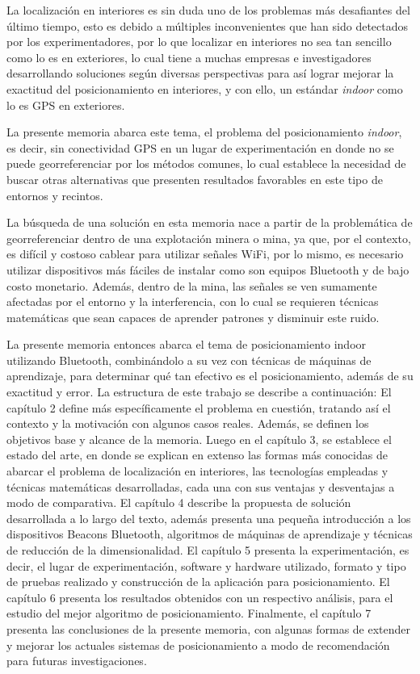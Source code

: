 La localización en interiores es sin duda uno de los problemas más desafiantes del último tiempo, esto es debido a múltiples inconvenientes que han sido detectados por los experimentadores, por lo que localizar en interiores no sea tan sencillo como lo es en exteriores, lo cual tiene a muchas empresas e investigadores desarrollando soluciones según diversas perspectivas para así lograr mejorar la exactitud del posicionamiento en interiores, y con ello,  un estándar \textit{indoor} como lo es GPS en exteriores.

La presente memoria abarca este tema, el problema del posicionamiento \textit{indoor}, es decir, sin conectividad GPS en un lugar de experimentación en donde no se puede georreferenciar por los métodos comunes, lo cual establece la necesidad de buscar otras alternativas que presenten resultados favorables en este tipo de entornos y recintos.

La búsqueda de una solución en esta memoria nace a partir de la problemática de georreferenciar dentro de una explotación minera o mina, ya que, por el contexto, es difícil y costoso cablear para utilizar señales WiFi, por lo mismo, es necesario utilizar dispositivos más fáciles de instalar como son equipos Bluetooth y de bajo costo monetario. Además, dentro de la mina, las señales se ven sumamente afectadas por el entorno y la interferencia, con lo cual se requieren técnicas matemáticas que sean capaces de aprender patrones y disminuir este ruido.

La presente memoria entonces abarca el tema de posicionamiento indoor utilizando Bluetooth, combinándolo a su vez con técnicas de máquinas de aprendizaje, para determinar qué tan efectivo es el posicionamiento, además de su exactitud y error. La estructura de este trabajo se describe a continuación: El capítulo 2 define más específicamente el problema en cuestión, tratando así el contexto y la motivación con algunos casos reales. Además, se definen los objetivos base y alcance de la memoria. Luego en el capítulo 3, se establece el estado del arte, en donde se explican en extenso las formas más conocidas de abarcar el problema de localización en interiores, las tecnologías empleadas y técnicas matemáticas desarrolladas, cada una con sus ventajas y desventajas a modo de comparativa. El capítulo 4 describe la propuesta de solución desarrollada a lo largo del texto, además presenta una pequeña introducción a los dispositivos Beacons Bluetooth, algoritmos de máquinas de aprendizaje y técnicas de reducción de la dimensionalidad. El capítulo 5 presenta la experimentación, es decir, el lugar de experimentación, software y hardware utilizado, formato y tipo de pruebas realizado y construcción de la aplicación para posicionamiento. El capítulo 6 presenta los resultados obtenidos con un respectivo análisis, para el estudio del mejor algoritmo de posicionamiento. Finalmente, el capítulo 7 presenta las conclusiones de la presente memoria, con algunas formas de extender y mejorar los actuales sistemas de posicionamiento a modo de recomendación para futuras investigaciones.
